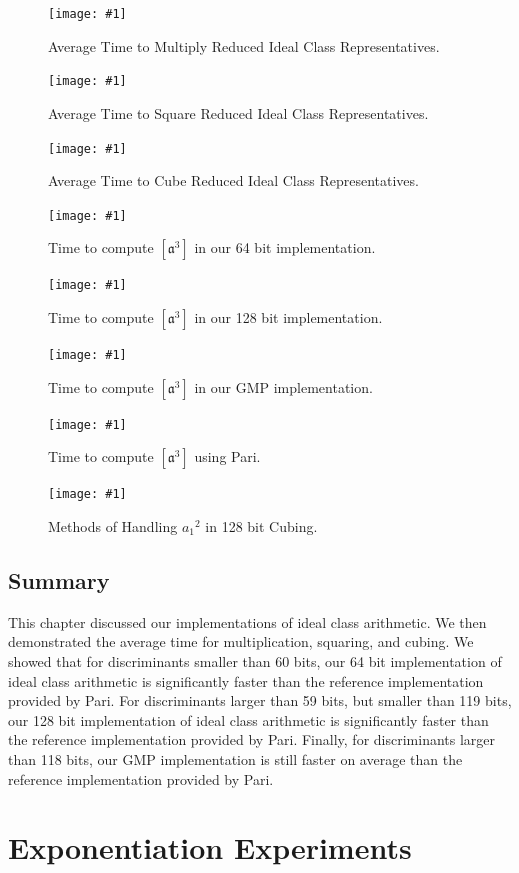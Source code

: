 \documentclass{ucalgthes1}
\theoremstyle{definition}
\newcommand{\mygraph}[3]{
	\begin{figure}[htb]
	\centering
	\texttt{[image: \#1]}
	\caption{#3}
	\label{#2}
	\end{figure}
}
\begin{document}
\mygraph{compose-all}{fig:idealCompose}{Average Time to Multiply Reduced Ideal Class Representatives.}
\mygraph{square-all}{fig:idealSquare}{Average Time to Square Reduced Ideal Class Representatives.}
\mygraph{cube-all}{fig:idealCube}{Average Time to Cube Reduced Ideal Class Representatives.}

\mygraph{cube-vs-64}{fig:cubingVs64}{Time to compute $[\mathfrak a^3]$ in our 64 bit implementation.}
\mygraph{cube-vs-128}{fig:cubingVs128}{Time to compute $[\mathfrak a^3]$ in our 128 bit implementation.}
\mygraph{cube-vs-mpz}{fig:cubingVsMpz}{Time to compute $[\mathfrak a^3]$ in our GMP implementation.}
\mygraph{cube-vs-pari}{fig:cubingVsPari}{Time to compute $[\mathfrak a^3]$ using Pari.}

\mygraph{smart-cubing-128}{fig:idealSmartCubing}{Methods of Handling ${a_1}^2$ in 128 bit Cubing.}

\clearpage

\section{Summary}

This chapter discussed our implementations of ideal class arithmetic.  We then demonstrated the average time for multiplication, squaring, and cubing.  We showed that for discriminants smaller than 60 bits, our 64 bit implementation of ideal class arithmetic is significantly faster than the reference implementation provided by Pari.  For discriminants larger than 59 bits, but smaller than 119 bits, our 128 bit implementation of ideal class arithmetic is significantly faster than the reference implementation provided by Pari.  Finally, for discriminants larger than 118 bits, our GMP implementation is still faster on average than the reference implementation provided by Pari.


\chapter{Exponentiation Experiments}
\label{chap:powExperiments}
\end{document}
